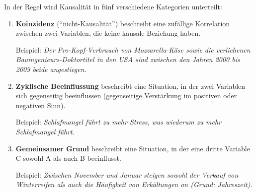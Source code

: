 \begin{mydefinition}[Kausalität]
In der Regel wird Kausalität in fünf verschiedene Kategorien unterteilt:
\begin{enumerate}
    \item \textbf{Koinzidenz} (\enquote{nicht-Kausalität}) beschreibt eine zufällige Korrelation zwischen zwei Variablen, die keine kausale Beziehung haben.
          \begin{center}
          \end{center}
          Beispiel: \textit{Der Pro-Kopf-Verbrauch von Mozzarella-Käse sowie die verliehenen Bauingenieurs-Doktortitel in den USA sind zwischen den Jahren 2000 bis 2009 beide angestiegen.}
    \item \textbf{Zyklische Beeinflussung} beschreibt eine Situation, in der zwei Variablen sich gegenseitig beeinflussen (gegenseitige Verstärkung im positiven oder negativen Sinn).
          \begin{center}
          \end{center}
          Beispiel: \textit{Schlafmangel führt zu mehr Stress, was wiederum zu mehr Schlafmangel führt.}
    \item \textbf{Gemeinsamer Grund} beschreibt eine Situation, in der eine dritte Variable C sowohl A als auch B beeinflusst.
          \begin{center}
          \end{center}
          Beispiel: \textit{Zwischen November und Januar steigen sowohl der Verkauf von Winterreifen als auch die Häufigkeit von Erkältungen an (Grund: Jahreszeit).}


\end{enumerate}
\end{mydefinition}
